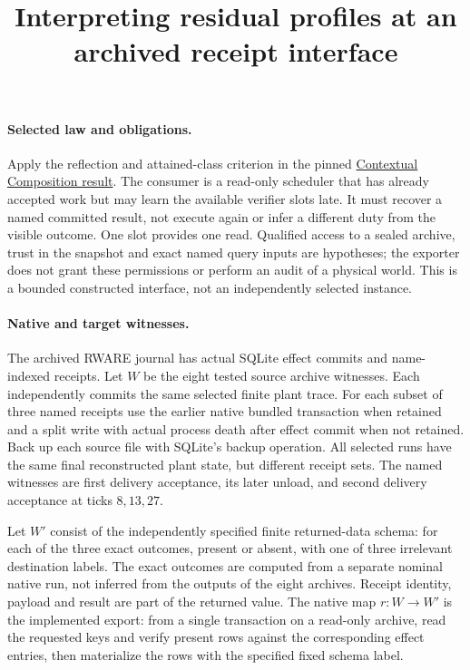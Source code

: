 \documentclass[11pt]{article}
\title{Interpreting residual profiles at an archived receipt interface}
\author{}\date{}
\begin{document}
\maketitle
\paragraph{Selected law and obligations.}
Apply the reflection and attained-class criterion in the pinned
\href{https://github.com/eternal-november/eos-research-programmes/blob/4359a8a1484498b9c46d8e58a0112448a1fba06b/projects/contextual-composition/feedback-and-concurrency/observable-covers/Residual_Profiles_and_Admission_Reflection.tex}
{Contextual Composition result}. The consumer is a read-only scheduler
that has already accepted work but may learn the available verifier
slots late. It must recover a named committed result, not execute again
or infer a different duty from the visible outcome.
One slot provides one read. Qualified access to a sealed archive,
trust in the snapshot and exact named query inputs are hypotheses;
the exporter does not grant these permissions or perform an audit of a
physical world. This is a bounded constructed interface, not an
independently selected instance.

\paragraph{Native and target witnesses.}
The archived RWARE journal has actual SQLite effect commits and
name-indexed receipts. Let \(W\) be the eight tested source archive
witnesses. Each independently commits the same selected finite plant
trace. For each subset of three named receipts use the earlier native
bundled transaction when retained and a split write with actual process
death after effect commit when not retained. Back up each source file
with SQLite's backup operation. All selected runs have the same
final reconstructed plant state, but different receipt sets.
The named witnesses are first delivery acceptance, its later unload,
and second delivery acceptance at ticks \(8,13,27\).

Let \(W'\) consist of the independently specified finite returned-data
schema: for each of the three exact outcomes, present or absent,
with one of three irrelevant destination labels. The exact outcomes are
computed from a separate nominal native run, not inferred from
the outputs of the eight archives. Receipt identity, payload and result
are part of the returned value. The native map \(r:W\to W'\) is the
implemented export: from a single transaction on a read-only archive,
read the requested keys and verify present rows against the corresponding
effect entries, then materialize the rows with the specified fixed schema label.
\end{document}
